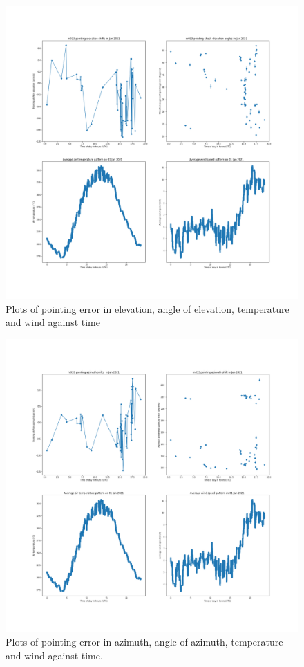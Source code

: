 \documentclass{article}
\begin{document}
\begin{figure}[H]
	\includegraphics[scale=0.35]{m033_elev_Jan.png}
	
	\caption{Plots of pointing error in elevation, angle of elevation, temperature and wind against time}
	\label{fig:m033ElevJan}
\end{figure}

\begin{figure}[H]
	\centering
	\includegraphics[scale=0.35]{m033_azim_Jan.png}
	
	\caption{Plots of pointing error in azimuth, angle of azimuth, temperature and wind against time.}
	\label{fig:m033AzimJan}
\end{figure}
\end{document}
